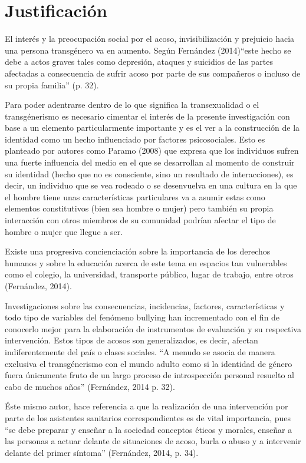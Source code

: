 \section{Justificación}

El interés y la preocupación social por el acoso, invisibilización y
prejuicio hacia una persona transgénero va en aumento.
Según Fernández (2014)“este hecho se debe a actos graves tales como
depresión, ataques y suicidios de las partes afectadas a consecuencia de sufrir
acoso por parte de sus compañeros o incluso de su propia familia” (p. 32).

Para poder adentrarse dentro de lo que significa la transexualidad o el transgénerismo es necesario cimentar el interés de la presente investigación con base a un elemento particularmente importante y es el ver a la construcción de la identidad como un hecho influenciado por factores psicosociales. Esto es planteado por autores como Paramo (2008) que expresa que los individuos sufren una fuerte influencia del medio en el que se desarrollan al momento de construir su identidad (hecho que no es consciente, sino un resultado de interacciones), es decir, un individuo que se vea rodeado o se desenvuelva en una cultura en la que el hombre tiene unas características particulares va a asumir estas como elementos constitutivos (bien sea hombre o mujer) pero también su propia interacción con otros miembros de su comunidad podrían afectar el tipo de hombre o mujer que llegue a ser.

 Existe una progresiva concienciación sobre la importancia de los derechos humanos y sobre la educación acerca de este tema en espacios tan vulnerables como el colegio, la universidad, transporte público, lugar de trabajo, entre otros (Fernández, 2014).

Investigaciones sobre las consecuencias, incidencias, factores, características y todo tipo de variables del fenómeno bullying han incrementado con el fin de conocerlo mejor para la elaboración de instrumentos de evaluación y su respectiva intervención. Estos tipos de acosos son generalizados, es decir, afectan indiferentemente del país o clases sociales. “A menudo se asocia de manera exclusiva el transgénerismo con el mundo adulto como si la identidad de género fuera únicamente fruto de un largo proceso de introspección personal resuelto al cabo de muchos años” (Fernández, 2014 p. 32).

Éste mismo autor, hace referencia a que la realización de una intervención por parte de los asistentes sanitarios correspondientes es de vital importancia, pues “se debe preparar y enseñar a la sociedad conceptos éticos y morales, enseñar a las personas a actuar delante de situaciones de acoso, burla o abuso y a intervenir delante del primer síntoma” (Fernández, 2014, p. 34).


